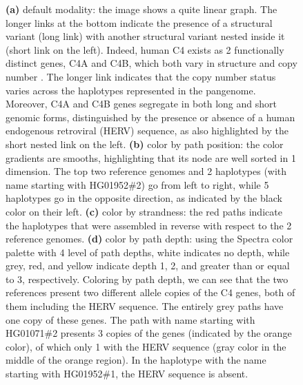 \begin{figure}[h!]
{        \textbf{(a)} default modality: the image shows a quite linear graph.
        The longer links at the bottom indicate the presence of a structural variant (long link) with another structural variant nested inside it (short link on the left).
        Indeed, human C4 exists as 2 functionally distinct genes, C4A and C4B, which both vary in structure and copy number \citep{Sekar_2016}. The longer link indicates that the copy number status varies across the haplotypes represented in the pangenome.
        Moreover, C4A and C4B genes segregate in both long and short genomic forms, distinguished by the presence or absence of a human endogenous retroviral (HERV) sequence, as also highlighted by the short nested link on the left.
        \textbf{(b)} color by path position: the color gradients are smooths, highlighting that its node are well sorted in 1 dimension.
        The top two reference genomes and 2 haplotypes (with name starting with HG01952\#2) go from left to right, while 5 haplotypes go in the opposite direction, as indicated by the black color on their left.
        \textbf{(c)} color by strandness: the red paths indicate the haplotypes that were assembled in reverse with respect to the 2 reference genomes.
        \textbf{(d)} color by path depth: using the Spectra color palette with 4 level of path depths, white indicates no depth, while grey, red, and yellow indicate depth 1, 2, and greater than or equal to 3, respectively.
        Coloring by path depth, we can see that the two references present two different allele copies of the C4 genes, both of them including the HERV sequence.
        The entirely grey paths have one copy of these genes.
        The path with name starting with HG01071\#2 presents 3 copies of the genes (indicated by the orange color), of which only 1 with the HERV sequence (gray color in the middle of the orange region).
        In the haplotype with the name starting with HG01952\#1, the HERV sequence is absent.
    }
    \label{fig:odgi_viz}
\end{figure}
